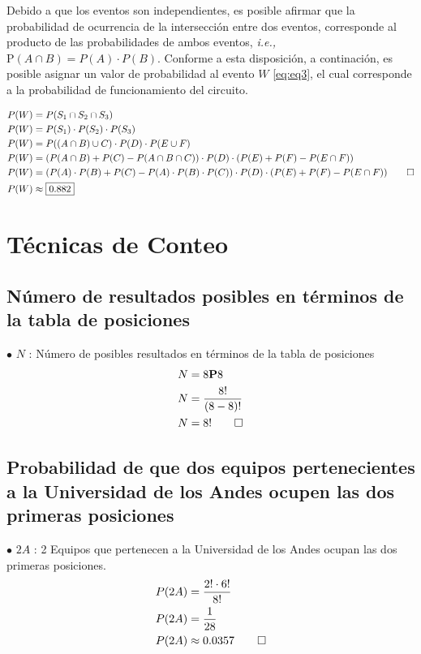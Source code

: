 \documentclass[paper=letterpaper]{article}
\begin{document}
Debido a que los eventos son independientes, es posible afirmar que la probabilidad de ocurrencia de la intersecci\'{o}n entre dos eventos, corresponde al producto de las probabilidades de ambos eventos, \textit{i.e.,} $\text{P}(A \cap B) = P(A) \cdot P(B)$. Conforme a esta disposici\'{o}n, a continaci\'{o}n, es posible asignar un valor de probabilidad al evento $W$ \eqref{eq:eq3}, el cual corresponde a la probabilidad de funcionamiento del circuito.

\begin{alignat*}{2}
P(W) &= P(S_1 \cap S_2 \cap S_3) \label{eq:e3} \\
P(W) &= P(S_1)\cdot P(S_2) \cdot P(S_3) \\
P(W) &= P((A \cap B) \cup C) \cdot P(D) \cdot P(E \cup F) \\
P(W) &= (P(A \cap B) + P(C) - P(A \cap B \cap C)) \cdot P(D) \cdot (P(E) + P(F) - P(E \cap F)) \\
P(W) &= (P(A) \cdot P(B) + P(C) - P(A)\cdot P(B) \cdot P(C)) \cdot P(D) \cdot (P(E) + P(F) - P(E \cap F)) \qed \\
P(W) &\approx \boxed{0.882}  
\end{alignat*}

\section{Técnicas de Conteo}
\subsection{Número de resultados posibles en términos de la tabla de posiciones}
$\bullet$ $N$ : Número de posibles resultados en términos de la tabla de posiciones 
\\
\begin{alignat*}{2}
   N &= 8 \text{\textbf{P}} 8 \\
   N &= \frac{8!}{(8-8)!} \\
   N &= 8! \qed  
\end{alignat*}

\subsection{Probabilidad de que dos equipos pertenecientes a la Universidad de los Andes ocupen las dos primeras posiciones}
$\bullet$ $2A$ : 2 Equipos que pertenecen a la Universidad de los Andes ocupan las dos primeras posiciones.
\\
\begin{alignat*}{2}
P(2A) &= \frac{2! \cdot 6!}{8!} \\
P(2A) &= \frac{1}{28} \\
P(2A) &\approx 0.0357 \qed
\end{alignat*}
\end{document}
